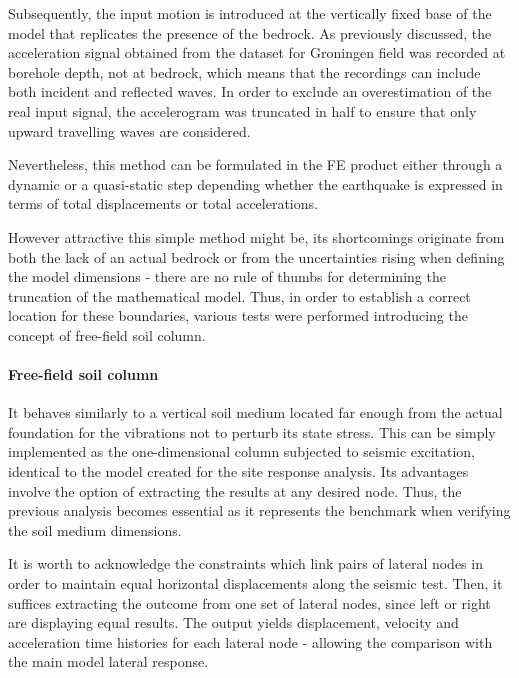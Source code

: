 	Subsequently, the input motion is introduced at the vertically fixed base of the model that replicates the presence of the bedrock. As previously discussed, the acceleration signal obtained from the dataset for Groningen field was recorded at borehole depth, not at bedrock, which means that the recordings can include both incident and reflected waves. In order to exclude an overestimation of the real input signal, the accelerogram was truncated in half to ensure that only upward travelling waves are considered.
	
	Nevertheless, this method can be formulated in the FE product either through a dynamic or a quasi-static step depending whether the earthquake is expressed in terms of total displacements or total accelerations.
	
	However attractive this simple method might be, its shortcomings originate from both the lack of an actual bedrock or from the uncertainties rising when defining the model dimensions - there are no rule of thumbs for determining the truncation of the mathematical model. Thus, in order to establish a correct location for these boundaries, various tests were performed introducing the concept of free-field soil column.
	
	\paragraph{Free-field soil column}
	It behaves similarly to a vertical soil medium located far enough from the actual foundation for the vibrations not to perturb its state stress. This can be simply implemented as the one-dimensional column subjected to seismic excitation, identical to the model created for the site response analysis. Its advantages involve the option of extracting the results at any desired node. Thus, the previous analysis becomes essential as it represents the benchmark when verifying the soil medium dimensions.
		
	It is worth to acknowledge the constraints which link pairs of lateral nodes in order to maintain equal horizontal displacements along the seismic test. Then, it suffices extracting the outcome from one set of lateral nodes, since left or right are displaying equal results. The output yields displacement, velocity and acceleration time histories for each lateral node - allowing the comparison with the main model lateral response.
			
